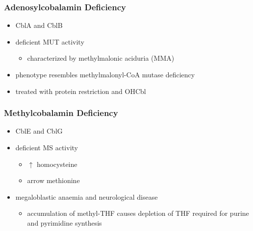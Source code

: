 \documentclass[12pt]{scrartcl}
\begin{document}
\subsubsection{Adenosylcobalamin Deficiency}
\label{sec:org662ff46}
\begin{itemize}
\item CblA and CblB
\item deficient MUT activity
\begin{itemize}
\item characterized by methylmalonic aciduria (MMA)
\end{itemize}
\item phenotype resembles methylmalonyl-CoA mutase deficiency
\item treated with protein restriction and OHCbl
\end{itemize}

\subsubsection{Methylcobalamin Deficiency}
\label{sec:orgc4080f0}
\begin{itemize}
\item CblE and CblG
\item deficient MS activity
\begin{itemize}
\item \(\uparrow\) homocysteine
\item \down arrow methionine
\end{itemize}
\item megaloblastic anaemia and neurological disease
\begin{itemize}
\item accumulation of methyl-THF causes depletion of THF required for
purine and pyrimidine synthesis
\end{itemize}
\end{itemize}
\end{document}
